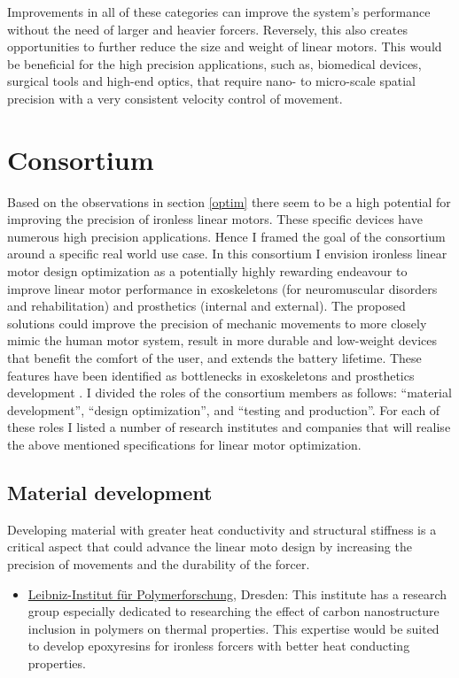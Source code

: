 \documentclass[
  oneside]{book}
\providecommand{\tightlist}{%
  \setlength{\itemsep}{0pt}\setlength{\parskip}{0pt}}
\begin{document}
Improvements in all of these categories can improve the system's performance without the need of larger and heavier forcers. Reversely, this also creates opportunities to further reduce the size and weight of linear motors. This would be beneficial for the high precision applications, such as, biomedical devices, surgical tools and high-end optics, that require nano- to micro-scale spatial precision with a very consistent velocity control of movement.

\hypertarget{consortium}{%
\section{Consortium}\label{consortium}}

Based on the observations in section \ref{optim} there seem to be a high potential for improving the precision of ironless linear motors. These specific devices have numerous high precision applications. Hence I framed the goal of the consortium around a specific real world use case. In this consortium I envision ironless linear motor design optimization as a potentially highly rewarding endeavour to improve linear motor performance in exoskeletons (for neuromuscular disorders and rehabilitation) and prosthetics (internal and external). The proposed solutions could improve the precision of mechanic movements to more closely mimic the human motor system, result in more durable and low-weight devices that benefit the comfort of the user, and extends the battery lifetime. These features have been identified as bottlenecks in exoskeletons and prosthetics development \citep{pasquina2015}. I divided the roles of the consortium members as follows: ``material development'', ``design optimization'', and ``testing and production''. For each of these roles I listed a number of research institutes and companies that will realise the above mentioned specifications for linear motor optimization.

\hypertarget{material-development}{%
\subsection{Material development}\label{material-development}}

Developing material with greater heat conductivity and structural stiffness is a critical aspect that could advance the linear moto design by increasing the precision of movements and the durability of the forcer.

\begin{itemize}
\tightlist
\item
  \href{https://www.ipfdd.de/en/research/institute-of-macromolecular-chemistry/functional-nanocomposites-and-blends/fields-of-research/composites-containing-carbon-nano-structures/}{Leibniz-Institut für Polymerforschung}, Dresden: This institute has a research group especially dedicated to researching the effect of carbon nanostructure inclusion in polymers on thermal properties. This expertise would be suited to develop epoxyresins for ironless forcers with better heat conducting properties.
\end{itemize}
\end{document}
